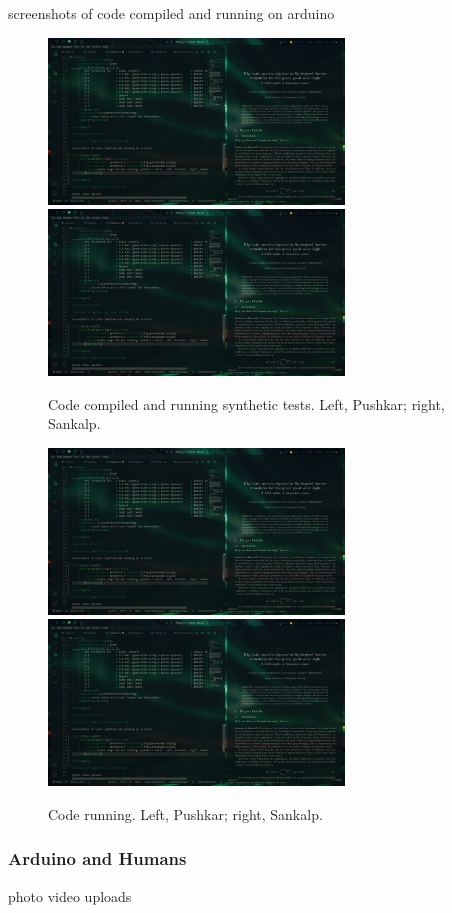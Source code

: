 screenshots of code compiled and running on arduino

\begin{figure}[ht]
    \centering
    \includegraphics[width=0.7\textwidth]{fig/pushkcompile.png}
    \includegraphics[width=0.7\textwidth]{fig/sankacompile.png}
    \caption{Code compiled and running synthetic tests. Left, Pushkar; right, Sankalp.}
\end{figure}

\begin{figure}[ht]
    \centering
    \includegraphics[width=0.7\textwidth]{fig/pushkreal.png}
    \includegraphics[width=0.7\textwidth]{fig/sankareal.png}
    \caption{Code running. Left, Pushkar; right, Sankalp.}
\end{figure}

\subsubsection{Arduino and Humans}

photo video uploads